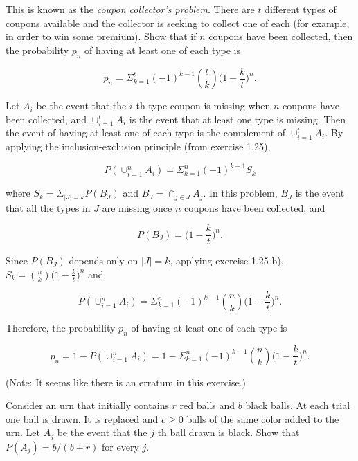 \begin{exercise}
  This is known as the \textit{coupon collector's problem}. There are $t$ different types of coupons available and the collector is seeking to collect one of each (for example, in order to win some premium). Show that if $n$ coupons have been collected, then the probability $p_n$ of having at least one of each type is

  \[ p_n = \Sigma_{k=1}^t(-1)^{k-1}\binom{t}{k}\Big(1 - \frac{k}{t}\Big)^n .\]
\end{exercise}
\begin{solution}
  Let $A_i$ be the event that the $i$-th type coupon is missing when $n$ coupons have been collected, and $\cup_{i=1}^t A_i$ is the event that at least one type is missing. Then the event of having at least one of each type is the complement of $\cup_{i=1}^t A_i$. By applying the inclusion-exclusion principle (from exercise 1.25),

  \[ P(\cup_{i=1}^n A_i) = \Sigma_{k=1}^n(-1)^{k-1}S_k \]

  where $S_k=\Sigma_{|J|=k}P(B_J)$ and $B_J=\cap_{j\in J}A_j$. In this problem, $B_J$ is the event that all the types in $J$ are missing once $n$ coupons have been collected, and

  \[ P(B_J) = \Big(1 - \frac{k}{t} \Big)^n .\]

  Since $P(B_J)$ depends only on $|J|=k$, applying exercise 1.25 b), $S_k = \binom{n}{k}\Big(1 - \frac{k}{t} \Big)^n$ and

  \[ P(\cup_{i=1}^n A_i) = \Sigma_{k=1}^n(-1)^{k-1}\binom{n}{k}\Big(1 - \frac{k}{t} \Big)^n .\]

  Therefore, the probability $p_n$ of having at least one of each type is

  \[ p_n = 1 - P(\cup_{i=1}^n A_i) = 1 - \Sigma_{k=1}^n(-1)^{k-1}\binom{n}{k}\Big(1 - \frac{k}{t} \Big)^n. \]

  (Note: It seems like there is an erratum in this exercise.)
\end{solution}


\begin{exercise}
  Consider an urn that initially contains $r$ red balls and $b$ black balls. At each trial one ball is drawn. It is replaced and $c\geq 0$ balls of the same color added to the urn. Let $A_j$ be the event that the $j$ th ball drawn is black. Show that $P(A_j)=b/(b+r)$ for every $j$.
\end{exercise}
\begin{solution}
  [TODO]
\end{solution}
